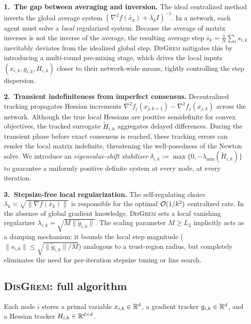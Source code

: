 \documentclass[review,onefignum,onetabnum]{siamart171218}
\begin{document}
	\noindent\textbf{1.\ The gap between averaging and inversion.}
	The ideal centralized method inverts the global average system
	$(\nabla^2 f(\bar x_k)+\lambda_k I)^{-1}$.
	In a network, each agent must solve a \emph{local} regularized
	system.
	Because the average of matrix inverses is not the inverse of the
	average, the resulting average step
	$\bar s_k=\frac1N\sum_i s_{i,k}$ inevitably deviates from the
	idealized global step.
	\textsc{DisGrem} mitigates this by introducing a multi-round
	pre-mixing stage, which drives the local inputs
	$(x_{i,k},g_{i,k},H_{i,k})$ closer to their network-wide means,
	tightly controlling the step dispersion.

	\noindent\textbf{2.\ Transient indefiniteness from imperfect consensus.}
	Decentralized tracking propagates Hessian increments
	$\nabla^2 f_j(x_{j,k+1})-\nabla^2 f_j(x_{j,k})$ across
	the network.
	Although the true local Hessians are positive semidefinite for
	convex objectives, the tracked surrogate $\tilde H_{i,k}$
	aggregates delayed differences.
	During the transient phase before exact consensus is reached,
	these tracking errors can render the local matrix indefinite,
	threatening the well-posedness of the Newton solve.
	We introduce an \emph{eigenvalue-shift stabilizer}
	$\delta_{i,k}:=\max\{0,-\lambda_{\min}(\tilde H_{i,k})\}$ to
	guarantee a uniformly positive definite system at every node,
	at every iteration.

	\noindent\textbf{3.\ Stepsize-free local regularization.}
	The self-regulating choice
	$\lambda_k\asymp\sqrt{\|\nabla f(\bar x_k)\|}$ is responsible
	for the optimal $\mathcal{O}(1/k^2)$ centralized rate.
	In the absence of global gradient knowledge, \textsc{DisGrem}
	sets a local vanishing regularizer
	$\lambda_{i,k}=\sqrt{M\|\tilde g_{i,k}\|}$.
	The scaling parameter $M\ge L_2$ implicitly acts as a damping
	mechanism: it bounds the local step magnitude
	($\|s_{i,k}\|\le\sqrt{\|\tilde g_{i,k}\|/M}$) analogous to a
	trust-region radius, but completely eliminates the need for
	per-iteration stepsize tuning or line search.
	
	\subsection{\textsc{DisGrem}: full algorithm}\label{ssec:disgrem}
	
	Each node $i$ stores a primal variable $x_{i,k}\in\mathbb{R}^d$, a gradient tracker $g_{i,k}\in\mathbb{R}^d$,
	and a Hessian tracker $H_{i,k}\in\mathbb{R}^{d\times d}$.
	
\end{document}
